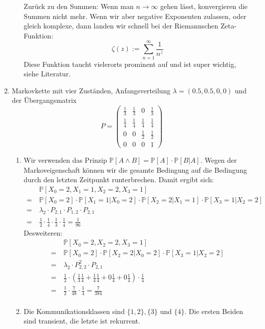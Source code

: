 \documentclass[a4paper,11pt,notitlepage,fullpage]{article}
\newcommand{\pp}[1]{\mathbb P\left[#1\right]}
\begin{document}
\begin{enumerate}
\begin{enumerate}
Zurück zu den Summen: Wenn man $n\rightarrow \infty$ gehen lässt, konvergieren die Summen nicht mehr. Wenn wir aber negative Exponenten zulassen, oder gleich komplexe, dann landen wir schnell bei der Riemannschen Zeta-Funktion:
$$\zeta (z) := \sum_{n=1}^\infty \frac{1}{n^z}$$
Diese Funktion taucht vielerorts prominent auf und ist super wichtig, siehe Literatur.
\end{enumerate}

\item Markovkette mit vier Zuständen, Anfangsverteilung $\lambda = (0.5, 0.5, 0, 0)$ und der Übergangsmatrix
$$P=\begin{pmatrix}
\frac{1}{3} & \frac{1}{3} & 0 & \frac{1}{3} \\
\frac{1}{4} & \frac{1}{4} & \frac{1}{4} & \frac{1}{4} \\
0 & 0 & \frac{1}{2} & \frac{1}{2} \\
0 & 0 & 0 & 1
\end{pmatrix}$$
\begin{enumerate}
\item Wir verwenden das Prinzip $\pp{A \wedge B} = \pp{A} \cdot \pp{B|A}$. Wegen der Markoveigenschaft können wir die gesamte Bedingung auf die Bedingung durch den letzten Zeitpunkt runterbrechen. Damit ergibt sich:
\begin{align*}
&\pp{X_0 = 2, X_1 = 1, X_2 = 2, X_3 = 1} \\
=~&\pp{X_0 = 2} \cdot \pp{X_1 = 1 | X_0 = 2} \cdot \pp{X_2 = 2 | X_1 = 1} \cdot \pp{X_3 = 1 | X_2 = 2} \\
=~&\lambda_2 \cdot P_{2, 1} \cdot P_{1, 2} \cdot P_{2, 1} \\
=~&\frac{1}{2} \cdot \frac{1}{4} \cdot \frac{1}{3} \cdot \frac{1}{4} = \frac{1}{96}
\end{align*}
Desweiteren:
\begin{align*}
&\pp{X_0 = 2, X_2 = 2, X_3 = 1} \\
=~&\pp{X_0 = 2} \cdot \pp{X_2 = 2 | X_0 = 2} \cdot \pp{X_3 = 1 | X_2 = 2} \\
=~&\lambda_2 \cdot P^2_{2, 2} \cdot P_{2, 1} \\
=~&\frac{1}{2} \cdot (\frac{1}{3}\frac{1}{4} + \frac{1}{4}\frac{1}{4} + 0 \frac{1}{4}+ 0 \frac{1}{4}) \cdot \frac{1}{4} \\
=~&\frac{1}{2} \cdot \frac{7}{48} \cdot \frac{1}{4}  = \frac{7}{384}\\
\end{align*}

\item Die Kommunikationsklassen sind $\{1, 2\}, \{3\}$ und $\{4\}$. Die ersten Beiden sind transient, die letzte ist rekurrent.


\end{enumerate}
\end{enumerate}
\end{document}

